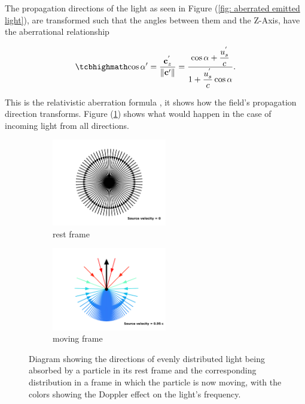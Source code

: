 The propagation directions of the light as seen in Figure (\ref{fig: aberrated emitted light}), are transformed such that the angles between them and the Z-Axis, have the aberrational relationship

\begin{equation}
	\label{eq: Cosine transform}
	\mhl{
		\cos\alpha{'} = \frac{\mathbf{c}_{z}^{'}}{\|\mathbf{c}{'}\|} = \dfrac{\cos\alpha + \dfrac{u_{s}^{'}}{c}}{1+\dfrac{u_{s}^{'}}{c}\cos\alpha}.
	}
\end{equation}

This is the relativistic aberration formula \cite{einstein1905electrodynamics}, it shows how the field's propagation direction transforms.
Figure (\ref{fig: aberrated absorbed light}) shows what would happen in the case of incoming light from all directions.

\begin{figure}[ht]
	\begin{subfigure}{.49\textwidth}
		\centering
		\includegraphics[width=5cm]{images/pdf/Aberrated_velocities_inwards_restframe.pdf}
		\caption{rest frame}
	\end{subfigure}
	\begin{subfigure}{.49\textwidth}
		\centering
		\includegraphics[width=5cm]{images/pdf/Aberrated_velocities_inwards.pdf}
		\caption{moving frame}
	\end{subfigure}
	\caption{Diagram showing the directions of evenly distributed light being absorbed by a particle in its rest frame and the corresponding distribution in a frame in which the particle is now moving, with the colors showing the Doppler effect on the light's frequency.}
	\label{fig: aberrated absorbed light}
\end{figure}

